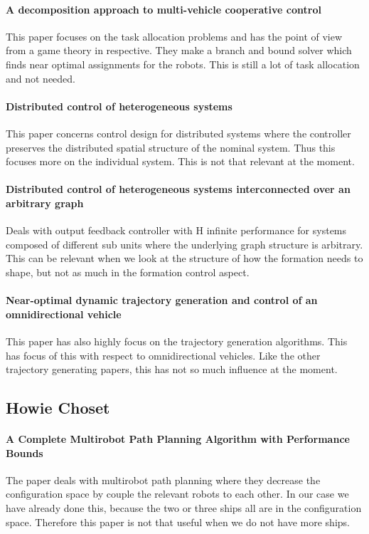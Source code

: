 \paragraph{A decomposition approach to multi-vehicle cooperative control}
This paper focuses on the task allocation problems and has the point of view from a game theory in respective. They make a branch and bound solver which finds near optimal assignments for the robots.
This is still a lot of task allocation and not needed.

\paragraph{Distributed control of heterogeneous systems}
This paper concerns control design for distributed systems where the controller preserves the distributed spatial structure of the nominal system. Thus this focuses more on the individual system.
This is not that relevant at the moment.

\paragraph{Distributed control of heterogeneous systems interconnected over an arbitrary graph}
Deals with output feedback controller with H infinite performance for systems composed of different sub units where the underlying graph structure is arbitrary.
This can be relevant when we look at the structure of how the formation needs to shape, but not as much in the formation control aspect.

\paragraph{Near-optimal dynamic trajectory generation and control of an omnidirectional vehicle}
This paper has also highly focus on the trajectory generation algorithms. This has focus of this with respect to omnidirectional vehicles.
Like the other trajectory generating papers, this has not so much influence at the moment.


\subsection{Howie Choset}

\paragraph{A Complete Multirobot Path Planning Algorithm with Performance Bounds}
The paper deals with multirobot path planning where they decrease the configuration space by couple the relevant robots to each other. In our case we have already done this, because the two or three ships all are in the configuration space.
Therefore this paper is not that useful when we do not have more ships.

